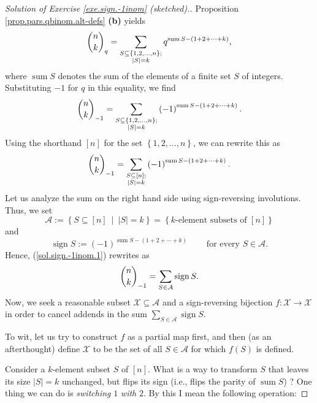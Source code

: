 \begin{proof}
[Solution of Exercise \ref{exe.sign.-1inom} (sketched).]Proposition
\ref{prop.pars.qbinom.alt-defs} \textbf{(b)} yields%
\[
\dbinom{n}{k}_{q}=\sum_{\substack{S\subseteq\left\{  1,2,\ldots,n\right\}
;\\\left\vert S\right\vert =k}}q^{\operatorname*{sum}S-\left(  1+2+\cdots
+k\right)  },
\]
where $\operatorname*{sum}S$ denotes the sum of the elements of a finite set
$S$ of integers. Substituting $-1$ for $q$ in this equality, we find%
\[
\dbinom{n}{k}_{-1}=\sum_{\substack{S\subseteq\left\{  1,2,\ldots,n\right\}
;\\\left\vert S\right\vert =k}}\left(  -1\right)  ^{\operatorname*{sum}%
S-\left(  1+2+\cdots+k\right)  }.
\]
Using the shorthand $\left[  n\right]  $ for the set $\left\{  1,2,\ldots
,n\right\}  $, we can rewrite this as%
\begin{equation}
\dbinom{n}{k}_{-1}=\sum_{\substack{S\subseteq\left[  n\right]  ;\\\left\vert
S\right\vert =k}}\left(  -1\right)  ^{\operatorname*{sum}S-\left(
1+2+\cdots+k\right)  }. \label{sol.sign.-1inom.1}%
\end{equation}
Let us analyze the sum on the right hand side using sign-reversing
involutions. Thus, we set%
\[
\mathcal{A}:=\left\{  S\subseteq\left[  n\right]  \ \mid\ \left\vert
S\right\vert =k\right\}  =\left\{  k\text{-element subsets of }\left[
n\right]  \right\}
\]
and%
\[
\operatorname*{sign}S:=\left(  -1\right)  ^{\operatorname*{sum}S-\left(
1+2+\cdots+k\right)  }\ \ \ \ \ \ \ \ \ \ \text{for every }S\in\mathcal{A}.
\]
Hence, (\ref{sol.sign.-1inom.1}) rewrites as%
\begin{equation}
\dbinom{n}{k}_{-1}=\sum_{S\in\mathcal{A}}\operatorname*{sign}S.
\label{sol.sign.-1inom.2}%
\end{equation}
Now, we seek a reasonable subset $\mathcal{X}\subseteq\mathcal{A}$ and a
sign-reversing bijection $f:\mathcal{X}\rightarrow\mathcal{X}$ in order to
cancel addends in the sum $\sum_{S\in\mathcal{A}}\operatorname*{sign}S$.

To wit, let us try to construct $f$ as a partial map first, and then (as an
afterthought) define $\mathcal{X}$ to be the set of all $S\in\mathcal{A}$ for
which $f\left(  S\right)  $ is defined.

Consider a $k$-element subset $S$ of $\left[  n\right]  $. What is a way to
transform $S$ that leaves its size $\left\vert S\right\vert =k$ unchanged, but
flips its sign (i.e., flips the parity of $\operatorname*{sum}S$) ? One thing
we can do is \emph{switching }$1$\emph{ with }$2$. By this I mean the
following operation:


\end{proof}

